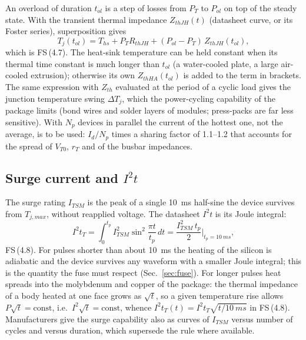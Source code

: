 \documentclass[10pt,a4paper]{scrartcl}
\newcommand{\Id}{I_{d}}
\newcommand{\ITSM}{I_{TSM}}
\newcommand{\iit}{I^{2}t}
\newcommand{\Tj}{T_{j}}
\newcommand{\fs}[1]{\textsf{FS}\,(#1)}
\begin{document}
An overload of duration $t_{ol}$ is a step of losses from $P_T$ to $P_{ol}$ on top of the steady state. With the transient thermal impedance $Z_{thJH}(t)$ (datasheet curve, or its Foster series), superposition gives
\begin{equation}
\Tj(t_{ol}) = T_{hs} + P_TR_{thJH} + (P_{ol}-P_T)\,Z_{thJH}(t_{ol}) ,
\label{eq:Tjolderiv}
\end{equation}
which is \fs{4.7}. The heat-sink temperature can be held constant when its thermal time constant is much longer than $t_{ol}$ (a water-cooled plate, a large air-cooled extrusion); otherwise its own $Z_{thHA}(t_{ol})$ is added to the term in brackets. The same expression with $Z_{th}$ evaluated at the period of a cyclic load gives the junction temperature swing $\Delta\Tj$, which the power-cycling capability of the package limits (bond wires and solder layers of modules; press-packs are far less sensitive). With $N_p$ devices in parallel the current of the hottest one, not the average, is to be used: $\Id/N_p$ times a sharing factor of 1.1--1.2 that accounts for the spread of $V_{T0}$, $r_T$ and of the busbar impedances.

\subsection{Surge current and \texorpdfstring{$\iit$}{I2t}}\label{sec:i2t}
The surge rating $\ITSM$ is the peak of a single \SI{10}{ms} half-sine the device survives from $T_{j,max}$, without reapplied voltage. The datasheet $\iit$ is its Joule integral:
\begin{equation}
\iit_T = \int_0^{t_p}\ITSM^2\sin^2\!\frac{\pi t}{t_p}\,dt = \frac{\ITSM^2\,t_p}{2}\Big|_{t_p = \SI{10}{ms}} ,
\label{eq:i2tderiv}
\end{equation}
\fs{4.8}. For pulses shorter than about \SI{10}{ms} the heating of the silicon is adiabatic and the device survives any waveform with a smaller Joule integral; this is the quantity the fuse must respect (Sec.~\ref{sec:fuse}). For longer pulses heat spreads into the molybdenum and copper of the package: the thermal impedance of a body heated at one face grows as $\sqrt t$, so a given temperature rise allows $P\sqrt t = \text{const}$, i.e.\ $I^2\sqrt t = \text{const}$, whence $\iit_T(t) = \iit_T\sqrt{t/\SI{10}{ms}}$ in \fs{4.8}. Manufacturers give the surge capability also as curves of $\ITSM$ versus number of cycles and versus duration, which supersede the rule where available.
\end{document}
